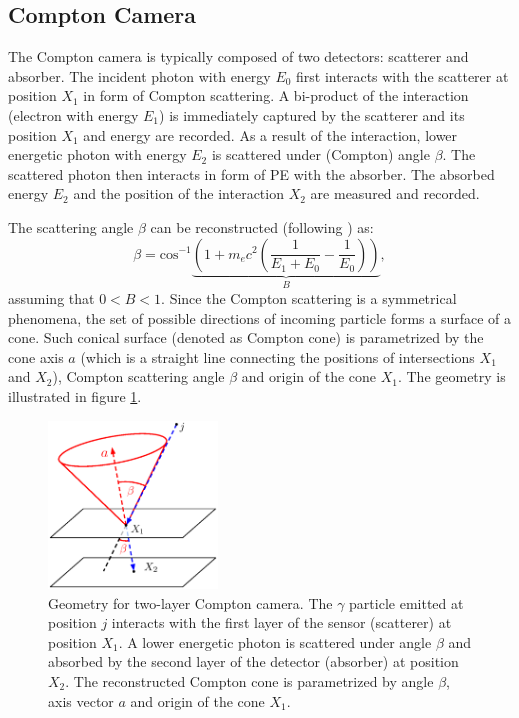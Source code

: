 \subsection{Compton Camera}%
The Compton camera is typically composed of two detectors: scatterer and absorber.
The incident photon with energy $E_{0}$ first interacts with the scatterer at position $X_{1}$ in form of Compton scattering.
A bi-product of the interaction (electron with energy $E_{1}$) is immediately captured by the scatterer and its position $X_{1}$ and energy are recorded.
As a result of the interaction, lower energetic photon with energy $E_{2}$ is scattered under (Compton) angle $\beta$.
The scattered photon then interacts in form of \ac{PE} with the absorber.
The absorbed energy $E_{2}$ and the position of the interaction $X_{2}$ are measured and recorded.

The scattering angle $\beta$ can be reconstructed (following \cite{baca2021gamma}) as:
\begin{equation}
  \beta = \mathrm{cos}^{-1} 
  \underset{B}{\underbrace{
  \left ( 1+m_{e}c^{2} \left( \frac{1}{E_{1}+E_{0}} - \frac{1}{E_{0}}\right )  \right )
  }},
    \label{eq:compton_beta_formula}
\end{equation}
assuming that $0<B<1$.
Since the Compton scattering is a symmetrical phenomena,  the set of possible directions of incoming particle forms a surface of a cone.
Such conical surface (denoted as Compton cone) is parametrized by the cone axis $a$ (which is a straight line connecting the positions of intersections $X_{1}$ and $X_{2}$), Compton scattering angle $\beta$ and origin of the cone $X_{1}$.
The geometry is illustrated in figure \ref{fig:compton_camera_geometry}.


\begin{figure}[!h]
  \centering
    \includegraphics[width=0.4\textwidth]{./fig/photos/compton_camera_modelll.eps}
    \caption{Geometry for two-layer Compton camera. The $\gamma$ particle emitted at position $j$ interacts with the first layer of the sensor (scatterer) at position $X_{1}$. A lower energetic photon is scattered under angle $\beta$ and absorbed by the second layer of the detector (absorber) at position $X_{2}$. The reconstructed Compton cone is parametrized by angle $\beta$, axis vector $a$ and origin of the cone $X_{1}$.}
    \label{fig:compton_camera_geometry}
\end{figure}


